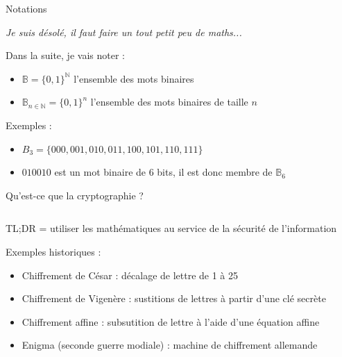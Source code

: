 \begin{frame}{Notations}
  \begin{tiny}
    \textit{Je suis désolé, il faut faire un tout petit peu de maths...}
  \end{tiny}

  Dans la suite, je vais noter :

  \begin{itemize}
    \item $\mathbb{B} = \{0,1\}^\mathbb{N}$ l'ensemble des mots binaires
    \item $\mathbb{B}_{n \in \mathbb{N}} = \{0,1\}^n$ l'ensemble des mots binaires de taille $n$
  \end{itemize}

  Exemples :

  \begin{itemize}
    \item $B_3 = \{000, 001, 010, 011, 100, 101, 110, 111\}$
    \item $010010$ est un mot binaire de 6 bits, il est donc membre de $\mathbb{B}_6$
  \end{itemize}
\end{frame}

\begin{frame}{Qu'est-ce que la cryptographie ?}
  \begin{columns}
    \begin{column}{0.65\textwidth}
      TL;DR = utiliser les mathématiques au service de la sécurité de l'information

      Exemples historiques :
      \begin{itemize}
        \item Chiffrement de César : décalage de lettre de 1 à 25
        \item Chiffrement de Vigenère : sustitions de lettres à partir d'une clé secrète
        \item Chiffrement affine : subsutition de lettre à l'aide d'une équation affine
        \item Enigma (seconde guerre modiale) : machine de chiffrement allemande
      \end{itemize}
    \end{column}

    \begin{column}{0.3\textwidth}
      
    \end{column}
  \end{columns}
\end{frame}

